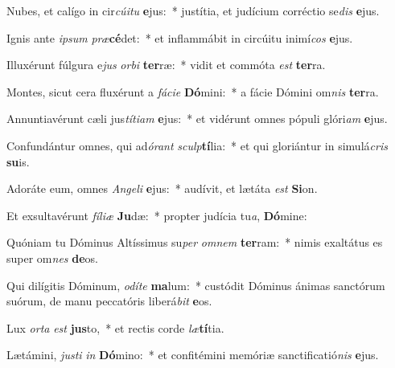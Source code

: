 \item Nubes, et calígo in cir\textit{cú}\textit{i}\textit{tu} \textbf{e}jus:~* justítia, et judícium corréctio se\textit{dis} \textbf{e}jus.
\item Ignis ante \textit{ip}\textit{sum} \textit{præ}\textbf{cé}det:~* et inflammábit in circúitu inimí\textit{cos} \textbf{e}jus.
\item Illuxérunt fúlgura e\textit{jus} \textit{or}\textit{bi} \textbf{ter}ræ:~* vidit et commóta \textit{est} \textbf{ter}ra.
\item Montes, sicut cera fluxérunt a \textit{fá}\textit{ci}\textit{e} \textbf{Dó}mini:~* a fácie Dómini om\textit{nis} \textbf{ter}ra.
\item Annuntiavérunt cæli jus\textit{tí}\textit{ti}\textit{am} \textbf{e}jus:~* et vidérunt omnes pópuli glóri\textit{am} \textbf{e}jus.
\item Confundántur omnes, qui ad\textit{ó}\textit{rant} \textit{sculp}\textbf{tí}lia:~* et qui gloriántur in simulá\textit{cris} \textbf{su}is.
\item Adoráte eum, omnes \textit{An}\textit{ge}\textit{li} \textbf{e}jus:~* audívit, et lætáta \textit{est} \textbf{Si}on.
\item Et exsultavérunt \textit{fí}\textit{li}\textit{æ} \textbf{Ju}dæ:~* propter judícia tu\textit{a}, \textbf{Dó}mine:
\item Quóniam tu Dóminus Altíssimus su\textit{per} \textit{om}\textit{nem} \textbf{ter}ram:~* nimis exaltátus es super om\textit{nes} \textbf{de}os.
\item Qui dilígitis Dóminum, \textit{o}\textit{dí}\textit{te} \textbf{ma}lum:~* custódit Dóminus ánimas sanctórum suórum, de manu peccatóris liberá\textit{bit} \textbf{e}os.
\item Lux \textit{or}\textit{ta} \textit{est} \textbf{jus}to,~* et rectis corde \textit{læ}\textbf{tí}tia.
\item Lætámini, \textit{jus}\textit{ti} \textit{in} \textbf{Dó}mino:~* et confitémini memóriæ sanctificatió\textit{nis} \textbf{e}jus.
